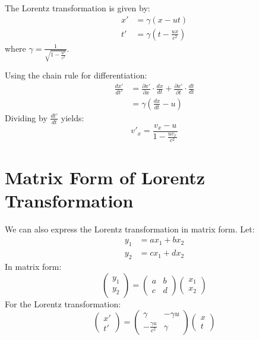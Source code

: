 \documentclass[a4paper,12pt]{article}
\begin{document}
\begin{multicols}{2}
The Lorentz transformation is given by:
\begin{align*}
  x' &= \gamma (x - ut) \\
  t' &= \gamma \left( t - \frac{ux}{c^2} \right)
\end{align*}
where $\gamma = \frac{1}{\sqrt{1 - \frac{u^2}{c^2}}}$.

Using the chain rule for differentiation:
\begin{align*}
  \frac{dx'}{dt'} &= \frac{\partial x'}{\partial x} \cdot \frac{dx}{dt} + \frac{\partial x'}{\partial t} \cdot \frac{dt}{dt} \\
                   &= \gamma \left( \frac{dx}{dt} - u \right)
\end{align*}
Dividing by $\frac{dt'}{dt}$ yields:
\begin{equation}
  v'_x = \frac{v_x - u}{1 - \frac{u v_x}{c^2}}
\end{equation}

\section*{Matrix Form of Lorentz Transformation}
We can also express the Lorentz transformation in matrix form. Let:
\begin{align*}
  y_1 &= a x_1 + b x_2 \\
  y_2 &= c x_1 + d x_2
\end{align*}
In matrix form:
\begin{equation}
  \begin{pmatrix} y_1 \\ y_2 \end{pmatrix} = \begin{pmatrix} a & b \\ c & d \end{pmatrix} \begin{pmatrix} x_1 \\ x_2 \end{pmatrix}
\end{equation}
For the Lorentz transformation:
\begin{equation}
  \begin{pmatrix} x' \\ t' \end{pmatrix} = \begin{pmatrix} \gamma & -\gamma u \\ -\frac{\gamma u}{c^2} & \gamma \end{pmatrix} \begin{pmatrix} x \\ t \end{pmatrix}
\end{equation}


\end{multicols}
\end{document}
